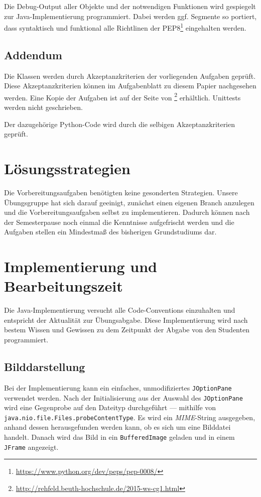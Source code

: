 \documentclass[tog]{acmsiggraph}
\newcommand{\code}[1]{\texttt{#1}}
\begin{document}
Die Debug-Output aller Objekte und der notwendigen Funktionen wird gespiegelt zur Java-Implementierung programmiert. Dabei werden ggf. Segmente so portiert, dass syntaktisch und funktional alle Richtlinen der PEP8\footnote{\url{https://www.python.org/dev/peps/pep-0008/}} eingehalten werden.

\subsection{Addendum}

Die Klassen werden durch Akzeptanzkriterien der vorliegenden Aufgaben geprüft. Diese Akzeptanzkriterien können im Aufgabenblatt zu diesem Papier nachgesehen werden. Eine Kopie der Aufgaben ist auf der Seite von \footnote{\url{http://rehfeld.beuth-hochschule.de/2015-ws-cg1.html}} erhältlich. Unittests werden nicht geschrieben.

Der dazugehörige Python-Code wird durch die selbigen Akzeptanzkriterien geprüft.

\section{Lösungsstrategien}

Die Vorbereitungsaufgaben benötigten keine gesonderten Strategien. Unsere Übungsgruppe hat sich darauf geeinigt, zunächst einen eigenen Branch anzulegen und die Vorbereitungsaufgaben selbst zu implementieren. Dadurch können nach der Semesterpause noch einmal die Kenntnisse aufgefrischt werden und die Aufgaben stellen ein Mindestmaß des bisherigen Grundstudiums dar.

\newpage
\section{Implementierung und Bearbeitungszeit}

Die Java-Implementierung versucht alle Code-Conventions einzuhalten und entspricht der Aktualität zur Übungsabgabe. Diese Implementierung wird nach bestem Wissen und Gewissen zu dem Zeitpunkt der Abgabe von den Studenten programmiert.

\subsection{Bilddarstellung}

Bei der Implementierung kann ein einfaches, unmodifiziertes \code{JOptionPane} verwendet werden. Nach der Initialisierung aus der Auswahl des \code{JOptionPane} wird eine Gegenprobe auf den Dateityp durchgeführt --- mithilfe von \code{java.nio.file.Files.probeContentType}. Es wird ein \textit{MIME}-String ausgegeben, anhand dessen herausgefunden werden kann, ob es sich um eine Bilddatei handelt. Danach wird das Bild in ein \code{BufferedImage} geladen und in einem \code{JFrame} angezeigt.
\end{document}
